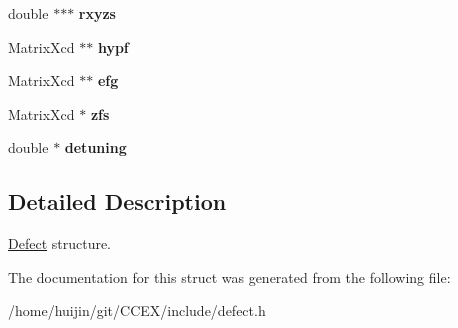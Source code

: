 \begin{DoxyCompactItemize}
\item 
\hypertarget{structDefect_a170046b2b2a7f4c623da0184b0dd70be}{double $\ast$$\ast$$\ast$ {\bfseries rxyzs}}\label{structDefect_a170046b2b2a7f4c623da0184b0dd70be}

\item 
\hypertarget{structDefect_ababc9cdad7369b2b91935d7ea1cbe9a7}{Matrix\-Xcd $\ast$$\ast$ {\bfseries hypf}}\label{structDefect_ababc9cdad7369b2b91935d7ea1cbe9a7}

\item 
\hypertarget{structDefect_a61772627b5a480389fbfc695cbcbd707}{Matrix\-Xcd $\ast$$\ast$ {\bfseries efg}}\label{structDefect_a61772627b5a480389fbfc695cbcbd707}

\item 
\hypertarget{structDefect_a43ec7a24e386ef84e218a0569fc6f3cc}{Matrix\-Xcd $\ast$ {\bfseries zfs}}\label{structDefect_a43ec7a24e386ef84e218a0569fc6f3cc}

\item 
\hypertarget{structDefect_a0d0e7d439cd2080f0c34986a38071c1e}{double $\ast$ {\bfseries detuning}}\label{structDefect_a0d0e7d439cd2080f0c34986a38071c1e}

\end{DoxyCompactItemize}


\subsection{Detailed Description}
\hyperlink{structDefect}{Defect} structure. 

The documentation for this struct was generated from the following file\-:\begin{DoxyCompactItemize}
\item 
/home/huijin/git/\-C\-C\-E\-X/include/defect.\-h\end{DoxyCompactItemize}
